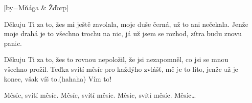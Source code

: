 [by={Mňága \& Žďorp}]

\beginverse*{}
\lrep{}       \rrep{}
\endverse{}

\beginverse{}
Děkuju Ti za to, žes mi ještě zavolala,  
moje duše černá, už to ani nečekala.  
Jenže moje drahá je to všechno trochu na nic,  
já už jsem se rozhod, zítra budu znovu panic.  
\endverse{}

\beginverse*{}
\lrep{}       \rrep{}
\endverse{}

\beginverse{}
Děkuju Ti za to, žes to rovnou nepoložil,  
že jsi nezapomněl, co jsi se mnou všechno prožil.  
Teďka svítí měsíc pro každýho zvlášť, mě je to líto,  
jenže už je konec, 
však víš to.(hahaha) Vím to! 
\endverse{}

\beginchorus{}
Měsíc,  svítí měsíc.  
Měsíc,  svítí měsíc.  
Měsíc,  svítí měsíc.  
Měsíc\ldots{}
\endchorus{}

\endsong{}
